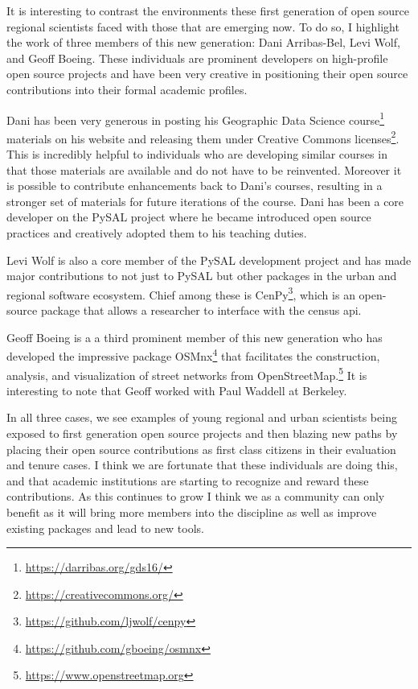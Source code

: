 \documentclass[11pt]{article}
\begin{document}
It is interesting to contrast the environments these first generation of open
source regional scientists faced with those that are emerging now. To do so, I
highlight the work of three members of this new generation: Dani Arribas-Bel,
Levi Wolf, and Geoff Boeing. These individuals are prominent developers on
high-profile open source projects and have been very creative in positioning
their open source contributions into their formal academic profiles.

Dani has been very generous in posting his Geographic Data Science course\footnote{\url{https://darribas.org/gds16/}}
materials on his website and releasing them under Creative Commons
licenses\footnote{\url{https://creativecommons.org/}}.  This is incredibly helpful to individuals who are developing
similar courses in that those materials are available and do not have to be
reinvented. Moreover it is possible to contribute enhancements back to Dani's
courses, resulting in a stronger set of materials for future iterations of the
course. Dani has been a core developer on the PySAL project where he became
introduced open source practices and creatively adopted them to his teaching
duties.


Levi Wolf is also a core member of the PySAL development project and has made
major contributions to not just to PySAL but other packages in the urban and
regional software ecosystem. Chief among these is CenPy\footnote{\url{https://github.com/ljwolf/cenpy}}, which is an
open-source package that allows a researcher to interface with the census api.

Geoff Boeing is a a third prominent member of this new generation who has
developed the impressive package OSMnx\footnote{\url{https://github.com/gboeing/osmnx}} that facilitates the
construction, analysis, and visualization of street networks from
OpenStreetMap.\footnote{\url{https://www.openstreetmap.org}} It is interesting to note that Geoff worked with Paul
Waddell at Berkeley. %

In all three cases, we see examples of young regional and urban scientists
being exposed to first generation open source projects and then blazing new
paths by placing their open source contributions as first class citizens in
their evaluation and tenure cases. I think we are fortunate that these
individuals are doing this, and that academic institutions are starting to
recognize and reward these contributions. As this continues to grow I think we
as a community can only benefit as it will bring more members into the
discipline as well as improve existing packages and lead to new tools.
\end{document}
